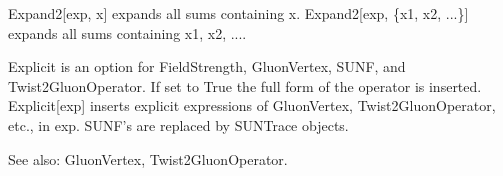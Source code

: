 






Expand2[exp, x] expands all sums containing x. Expand2[exp, \{x1, x2, ...\}] { }expands all sums containing x1, x2, ....






Explicit is an option for FieldStrength, GluonVertex, SUNF, and Twist2GluonOperator. If set to True the full form of the operator is
  inserted. Explicit[exp] inserts explicit expressions of GluonVertex, Twist2GluonOperator, etc., in exp. SUNF's are replaced by SUNTrace objects.

See also:  GluonVertex, Twist2GluonOperator.






